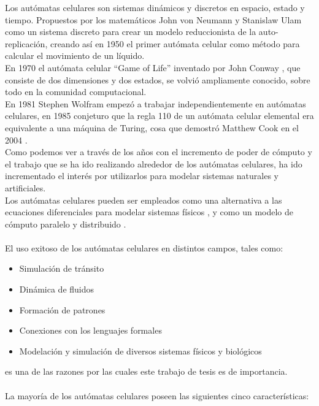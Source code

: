 Los autómatas celulares son sistemas dinámicos y discretos en espacio, estado y tiempo. Propuestos por los matemáticos John von Neumann y Stanislaw Ulam como un sistema discreto para crear un modelo reduccionista de la auto-replicación, creando así en 1950 el primer autómata celular como método para calcular el movimiento de un líquido. 
\\
En 1970 el autómata celular “Game of Life” inventado por John Conway \citep{gardner1970mathematical}, que consiste de dos dimensiones y dos estados, se volvió ampliamente conocido, sobre todo en la comunidad computacional.
\\
En 1981 Stephen Wolfram empezó a trabajar independientemente en autómatas celulares, en 1985 conjeturo que la regla 110 de un autómata celular elemental era equivalente a una máquina de Turing, cosa que demostró Matthew Cook en el 2004 \citep{cook2004universality}.
\\
Como podemos ver a través de los años con el incremento de poder de cómputo y el trabajo que se ha ido realizando alrededor de los autómatas celulares, ha ido incrementado el interés por utilizarlos para modelar sistemas naturales y artificiales.
\\
Los autómatas celulares pueden ser empleados como una alternativa a las ecuaciones diferenciales para modelar sistemas físicos \citep{toffoli1984cellular}, y como un modelo de cómputo paralelo y distribuido \citep{hillis1984connection}.
\\
\\
El uso exitoso de los autómatas celulares en distintos campos, tales como:

\begin{itemize}
	\item Simulación de tránsito \citep{simon1998simplified}
	\item Dinámica de fluidos  \citep{margolus1986cellular}
	\item Formación de patrones \citep{tamayo1987cellular,boerlijstk}
	\item Conexiones con los lenguajes formales \citep{nordahl1989formal,culik1990computation}
	\item Modelación y simulación de diversos sistemas físicos \citep{vichniac1984simulating,manneville2012cellular} y biológicos \citep{ermentrout1993cellular}
\end{itemize}

es una de las razones por las cuales este trabajo de tesis es de importancia.
\\
\\
La mayoría de los autómatas celulares poseen las siguientes cinco características\citep{ilachinski2001cellular}:

